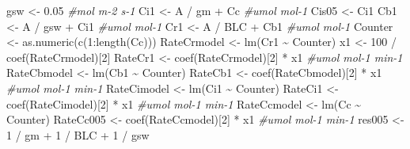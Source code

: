\documentclass[
]{krantz}
\makeatletter
\newenvironment{Shaded}{\begin{snugshade}}{\end{snugshade}}
\newcommand{\CommentTok}[1]{\textcolor[rgb]{0.56,0.35,0.01}{\textit{#1}}}
\newcommand{\DecValTok}[1]{\textcolor[rgb]{0.00,0.00,0.81}{#1}}
\newcommand{\FloatTok}[1]{\textcolor[rgb]{0.00,0.00,0.81}{#1}}
\newcommand{\FunctionTok}[1]{\textcolor[rgb]{0.00,0.00,0.00}{#1}}
\newcommand{\NormalTok}[1]{#1}
\newcommand{\OtherTok}[1]{\textcolor[rgb]{0.56,0.35,0.01}{#1}}
\newcommand{\SpecialCharTok}[1]{\textcolor[rgb]{0.00,0.00,0.00}{#1}}
\newenvironment{kframe}{%
\medskip{}
\setlength{\fboxsep}{.8em}
 \def\at@end@of@kframe{}%
 \ifinner\ifhmode%
  \def\at@end@of@kframe{\end{minipage}}%
  \begin{minipage}{\columnwidth}%
 \fi\fi%
 \def\FrameCommand##1{\hskip\@totalleftmargin \hskip-\fboxsep
 \colorbox{shadecolor}{##1}\hskip-\fboxsep
     \hskip-\linewidth \hskip-\@totalleftmargin \hskip\columnwidth}%
 \MakeFramed {\advance\hsize-\width
   \@totalleftmargin\z@ \linewidth\hsize
   \@setminipage}}%
 {\par\unskip\endMakeFramed%
 \at@end@of@kframe}
\renewenvironment{Shaded}{\begin{kframe}}{\end{kframe}}
\makeatother
\begin{document}
\begin{Shaded}
\begin{Highlighting}[]
\NormalTok{gsw }\OtherTok{\textless{}{-}} \FloatTok{0.05} \CommentTok{\#mol m{-}2 s{-}1}
\NormalTok{Ci1 }\OtherTok{\textless{}{-}}\NormalTok{ A }\SpecialCharTok{/}\NormalTok{ gm }\SpecialCharTok{+}\NormalTok{ Cc }\CommentTok{\#umol mol{-}1}
\NormalTok{Cis05 }\OtherTok{\textless{}{-}}\NormalTok{ Ci1}
\NormalTok{Cb1 }\OtherTok{\textless{}{-}}\NormalTok{ A }\SpecialCharTok{/}\NormalTok{ gsw }\SpecialCharTok{+}\NormalTok{ Ci1 }\CommentTok{\#umol mol{-}1}
\NormalTok{Cr1 }\OtherTok{\textless{}{-}}\NormalTok{ A }\SpecialCharTok{/}\NormalTok{ BLC }\SpecialCharTok{+}\NormalTok{ Cb1 }\CommentTok{\#umol mol{-}1}
\NormalTok{Counter }\OtherTok{\textless{}{-}} \FunctionTok{as.numeric}\NormalTok{(}\FunctionTok{c}\NormalTok{(}\DecValTok{1}\SpecialCharTok{:}\FunctionTok{length}\NormalTok{(Cc)))}
\NormalTok{RateCrmodel }\OtherTok{\textless{}{-}} \FunctionTok{lm}\NormalTok{(Cr1 }\SpecialCharTok{\textasciitilde{}}\NormalTok{ Counter)}
\NormalTok{x1 }\OtherTok{\textless{}{-}} \DecValTok{100} \SpecialCharTok{/} \FunctionTok{coef}\NormalTok{(RateCrmodel)[}\DecValTok{2}\NormalTok{]}
\NormalTok{RateCr1 }\OtherTok{\textless{}{-}} \FunctionTok{coef}\NormalTok{(RateCrmodel)[}\DecValTok{2}\NormalTok{] }\SpecialCharTok{*}\NormalTok{ x1 }\CommentTok{\#umol mol{-}1 min{-}1}
\NormalTok{RateCbmodel }\OtherTok{\textless{}{-}} \FunctionTok{lm}\NormalTok{(Cb1 }\SpecialCharTok{\textasciitilde{}}\NormalTok{ Counter)}
\NormalTok{RateCb1 }\OtherTok{\textless{}{-}} \FunctionTok{coef}\NormalTok{(RateCbmodel)[}\DecValTok{2}\NormalTok{] }\SpecialCharTok{*}\NormalTok{ x1 }\CommentTok{\#umol mol{-}1 min{-}1}
\NormalTok{RateCimodel }\OtherTok{\textless{}{-}} \FunctionTok{lm}\NormalTok{(Ci1 }\SpecialCharTok{\textasciitilde{}}\NormalTok{ Counter)}
\NormalTok{RateCi1 }\OtherTok{\textless{}{-}} \FunctionTok{coef}\NormalTok{(RateCimodel)[}\DecValTok{2}\NormalTok{] }\SpecialCharTok{*}\NormalTok{ x1 }\CommentTok{\#umol mol{-}1 min{-}1}
\NormalTok{RateCcmodel }\OtherTok{\textless{}{-}} \FunctionTok{lm}\NormalTok{(Cc }\SpecialCharTok{\textasciitilde{}}\NormalTok{ Counter)}
\NormalTok{RateCc005 }\OtherTok{\textless{}{-}} \FunctionTok{coef}\NormalTok{(RateCcmodel)[}\DecValTok{2}\NormalTok{] }\SpecialCharTok{*}\NormalTok{ x1 }\CommentTok{\#umol mol{-}1 min{-}1}
\NormalTok{res005 }\OtherTok{\textless{}{-}} \DecValTok{1} \SpecialCharTok{/}\NormalTok{ gm }\SpecialCharTok{+} \DecValTok{1} \SpecialCharTok{/}\NormalTok{ BLC }\SpecialCharTok{+} \DecValTok{1} \SpecialCharTok{/}\NormalTok{ gsw}


\end{Highlighting}
\end{Shaded}
\end{document}
